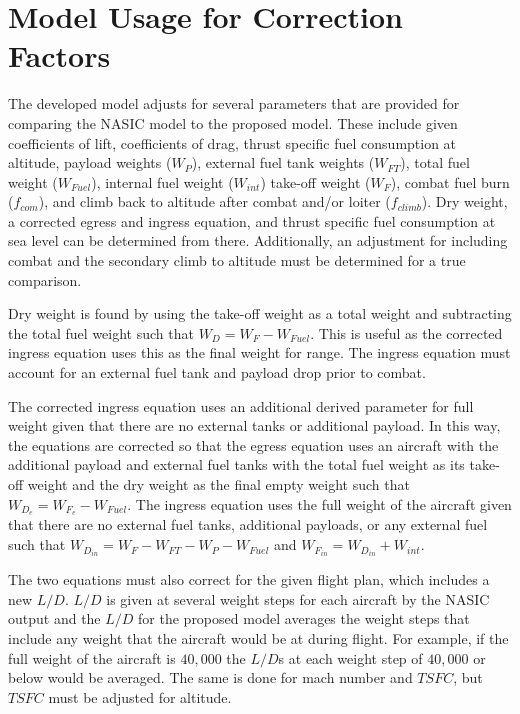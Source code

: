 \section{Model Usage for Correction Factors}
\label{section:modelUsage}
The developed model adjusts for several parameters that are provided for comparing the NASIC model to the proposed model. These include given coefficients of lift, coefficients of drag, thrust specific fuel consumption at altitude, payload weights ($W_P$), external fuel tank weights ($W_{FT}$), total fuel weight ($W_{Fuel}$), internal fuel weight ($W_{int}$) take-off weight ($W_F$), combat fuel burn ($f_{com}$), and climb back to altitude after combat and/or loiter ($f_{climb}$). Dry weight, a corrected egress and ingress equation, and thrust specific fuel consumption at sea level can be determined from there. Additionally, an adjustment for including combat and the secondary climb to altitude must be determined for a true comparison.\par
Dry weight is found by using the take-off weight as a total weight and subtracting the total fuel weight such that $W_D = W_F - W_{Fuel}$. This is useful as the corrected ingress equation uses this as the final weight for range. The ingress equation must account for an external fuel tank and payload drop prior to combat.\par
The corrected ingress equation uses an additional derived parameter for full weight given that there are no external tanks or additional payload. In this way, the equations are corrected so that the egress equation uses an aircraft with the additional payload and external fuel tanks with the total fuel weight as its take-off weight and the dry weight as the final empty weight such that $W_{D_e} = W_{F_e}-W_{Fuel}$. The ingress equation uses the full weight of the aircraft given that there are no external fuel tanks, additional payloads, or any external fuel such that $W_{D_{in}} = W_F-W_{FT}-W_P - W_{Fuel}$ and $W_{F_{in}} = W_{D_{in}} + W_{int}$. \par
The two equations must also correct for the given flight plan, which includes a new $L/D$. $L/D$ is given at several weight steps for each aircraft by the NASIC output and the $L/D$ for the proposed model averages the weight steps that include any weight that the aircraft would be at during flight. For example, if the full weight of the aircraft is $40,000$ the $L/D$s at each weight step of $40,000$ or below would be averaged. The same is done for mach number and $TSFC$, but $TSFC$ must be adjusted for altitude.\par
